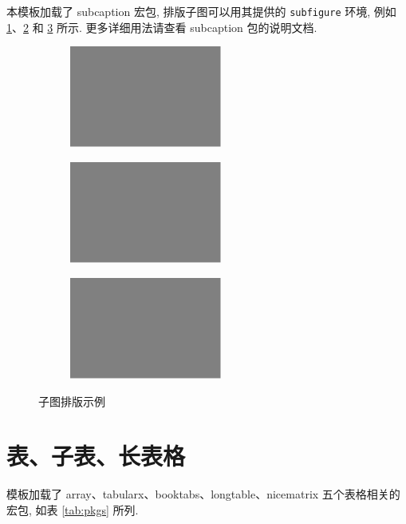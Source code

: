 \documentclass[final]{ncuthesis}
\begin{document}
本模板加载了 \textsf{subcaption} 宏包, 排版子图可以用其提供的 \verb|subfigure| 环境, 例如 \ref{fig:subfigexp-a}、\ref{fig:subfigexp-b} 和 \ref{fig:subfigexp-c} 所示. 更多详细用法请查看 \textsf{subcaption} 包的说明文档. 
\begin{figure}[b]%
\centering
\begin{subfigure}{.45\textwidth}%
\centering
\includegraphics[width=5cm]{figures/test.pdf}%
%
\label{fig:subfigexp-a}%
\end{subfigure}
\subcaptionpatch
\begin{subfigure}{.45\textwidth}%
\centering
\includegraphics[width=5cm]{figures/test.pdf}%
%
\label{fig:subfigexp-b}%
\end{subfigure}%
\begin{subfigure}{.45\textwidth}%
\centering
\includegraphics[width=5cm]{figures/test.pdf}%
%
\label{fig:subfigexp-c}%
\end{subfigure}%
\caption{子图排版示例}%
\label{fig:subfig}%
\end{figure}
\section{表、子表、长表格}
模板加载了 \textsf{array}、\textsf{tabularx}、\textsf{booktabs}、\textsf{longtable}、\textsf{nicematrix} 五个表格相关的宏包, 如表 \ref{tab:pkgs} 所列. 
\end{document}
